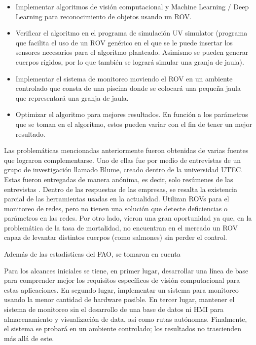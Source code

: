 \begin{itemize}
    \item Implementar algoritmos de visión computacional y Machine Learning / Deep Learning para reconocimiento de objetos usando un ROV. 
    \item Verificar el algoritmo en el programa de simulación UV simulator (programa que facilita el uso de un ROV genérico en el que se le puede insertar los sensores necesarios para el algoritmo planteado. Asimismo se pueden generar cuerpos rígidos, por lo que también se logrará simular una granja de jaula).
    \item Implementar el sistema de monitoreo moviendo el ROV en un ambiente controlado que consta de una piscina donde se colocará una pequeña jaula que representará una granja de jaula.
    \item Optimizar el algoritmo para mejores resultados. En función a los parámetros que se toman en el algoritmo, estos pueden variar con el fin de tener un mejor resultado.
\end{itemize}


Las problemáticas mencionadas anteriormente fueron obtenidas de varias fuentes que lograron complementarse. Uno de ellas fue por medio de entrevistas de un grupo de investigación llamado Blume, creado dentro de la universidad UTEC. Estas fueron entregadas de manera anónima, es decir, solo resúmenes de las entrevistas \cite{Entrevistas_Blume}. Dentro de las respuestas de las empresas, se resalta la existencia parcial de las herramientas usadas en la actualidad. Utilizan ROVs para el monitoreo de redes, pero no tienen una solución que detecte deficiencias o parámetros en las redes. Por otro lado, vieron una gran oportunidad ya que, en la problemática de la tasa de mortalidad, no encuentran en el mercado un ROV capaz de levantar distintos cuerpos (como salmones) sin perder el control. 

Además de las estadísticas del FAO, se tomaron en cuenta 


Para los alcances iniciales se tiene, en primer lugar, desarrollar una línea de base para comprender mejor los requisitos específicos de visión computacional para estas aplicaciones. En segundo lugar, implementar un sistema para monitoreo usando la menor cantidad de hardware posible. En tercer lugar, mantener el sistema de monitoreo sin el desarrollo de una base de datos ni HMI para almacenamiento y visualización de data, así como rutas autónomas. Finalmente, el sistema se probará en un ambiente controlado; los resultados no trascienden más allá de este. 